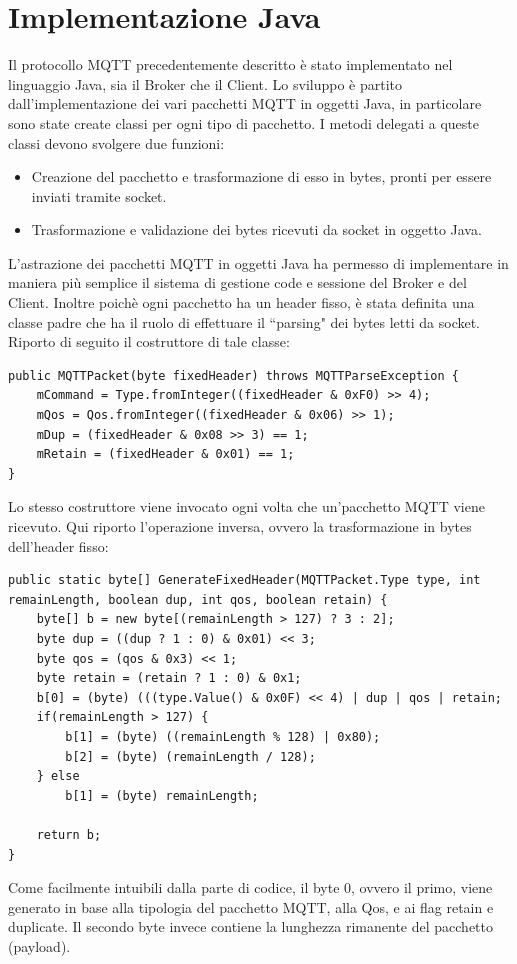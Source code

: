 \documentclass{article}
\begin{document}
\section{Implementazione Java}
Il protocollo MQTT precedentemente descritto è stato implementato nel linguaggio Java, sia il Broker che il Client. Lo sviluppo è partito dall'implementazione dei vari pacchetti MQTT in oggetti Java, in particolare sono state create classi per ogni tipo di pacchetto. I metodi delegati a queste classi devono svolgere due funzioni:
\begin{itemize}
	\item Creazione del pacchetto e trasformazione di esso in bytes, pronti per essere inviati tramite socket.
	\item Trasformazione e validazione dei bytes ricevuti da socket in oggetto Java.
\end{itemize}
L'astrazione dei pacchetti MQTT in oggetti Java ha permesso di implementare in maniera più semplice il sistema di gestione code e sessione del Broker e del Client. Inoltre poichè ogni pacchetto ha un header fisso, è stata definita una classe padre che ha il ruolo di effettuare il ``parsing" dei bytes letti da socket. Riporto di seguito il costruttore di tale classe:
\begin{lstlisting}[style=JavaStyle]
public MQTTPacket(byte fixedHeader) throws MQTTParseException {
	mCommand = Type.fromInteger((fixedHeader & 0xF0) >> 4);
	mQos = Qos.fromInteger((fixedHeader & 0x06) >> 1);
	mDup = (fixedHeader & 0x08 >> 3) == 1;
	mRetain = (fixedHeader & 0x01) == 1;
}
\end{lstlisting}
Lo stesso costruttore viene invocato ogni volta che un'pacchetto MQTT viene ricevuto. Qui riporto l'operazione inversa, ovvero la trasformazione in bytes dell'header fisso:
\begin{lstlisting}[style=JavaStyle]
public static byte[] GenerateFixedHeader(MQTTPacket.Type type, int remainLength, boolean dup, int qos, boolean retain) {
	byte[] b = new byte[(remainLength > 127) ? 3 : 2];
	byte dup = ((dup ? 1 : 0) & 0x01) << 3;
	byte qos = (qos & 0x3) << 1;
	byte retain = (retain ? 1 : 0) & 0x1;
	b[0] = (byte) (((type.Value() & 0x0F) << 4) | dup | qos | retain;
	if(remainLength > 127) {
		b[1] = (byte) ((remainLength % 128) | 0x80);
		b[2] = (byte) (remainLength / 128);
	} else
		b[1] = (byte) remainLength;
	
	return b;
}
\end{lstlisting}
Come facilmente intuibili dalla parte di codice, il byte 0, ovvero il primo, viene generato in base alla tipologia del pacchetto MQTT, alla Qos, e ai flag retain e duplicate. Il secondo byte invece contiene la lunghezza rimanente del pacchetto (payload).\\\\
\end{document}
